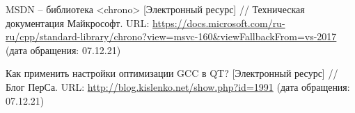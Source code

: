 
%


\begin{thebibliography}{3}	
	MSDN -- библиотека <chrono> [Электронный ресурс] //
	Техническая документация Майкрософт.
	URL: \url{https://docs.microsoft.com/ru-ru/cpp/standard-library/chrono?view=msvc-160&viewFallbackFrom=vs-2017}
	(дата обращения: 07.12.21)
	
	Как применить настройки оптимизации GCC в QT? [Электронный ресурс] //
	Блог ПерСа.
	URL:
	\url{http://blog.kislenko.net/show.php?id=1991}
	(дата обращения: 07.12.21)
\end{thebibliography}